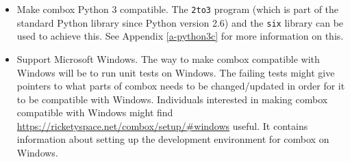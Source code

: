 \begin{itemize}
\item Make combox Python 3 compatible. The \verb+2to3+ program (which
  is part of the standard Python library since Python version 2.6) and
  the \verb+six+ library can be used to achieve this. See Appendix
  \ref{a-python3c} for more information on this.

\item Support Microsoft Windows. The way to make combox compatible
  with Windows will be to run unit tests on Windows. The failing tests
  might give pointers to what parts of combox needs to be
  changed/updated in order for it to be compatible with
  Windows. Individuals interested in making combox compatible with
  Windows might find
  \url{https://ricketyspace.net/combox/setup/#windows} useful. It
  contains information about setting up the development environment
  for combox on Windows.
\end{itemize}
